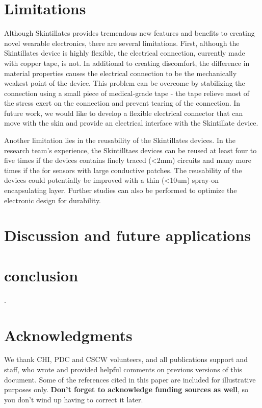 \documentclass{sigchi}
\begin{document}
\section {Limitations}
Although Skintillates provides tremendous new features and benefits to creating novel wearable electronics, there are several limitations. First, although the Skintillates device is highly flexible, the electrical connection, currently made with copper tape, is not. In additional to creating discomfort, the difference in material  properties causes the electrical connection to be the mechanically weakest point of the device. This problem can be overcome by stabilizing the connection using a small piece of medical-grade tape - the tape relieve most of the stress exert on the connection and prevent tearing of the connection. In future work, we would like to develop a flexible electrical connector that can move with the skin and provide an electrical interface with the Skintillate device. 

Another limitation lies in the reusability of the Skintillates devices. In the research team's experience, the Skintilltaes devices can be reused at least four to five times if the devices contains finely traced (<2mm) circuits and many more times if the for sensors with large conductive patches. The reusability of the devices could potentially be improved with a thin (<10um) spray-on encapsulating layer. Further studies can also be performed to optimize the electronic design for durability. 

\section {Discussion and future applications}

\section {conclusion}
 \cite{Kim:2015ii}.



\section{Acknowledgments}

We thank CHI, PDC and CSCW volunteers, and all publications support
and staff, who wrote and provided helpful comments on previous
versions of this document.  Some of the references cited in this paper
are included for illustrative purposes only.  \textbf{Don't forget
to acknowledge funding sources as well}, so you don't wind up
having to correct it later.
\end{document}
